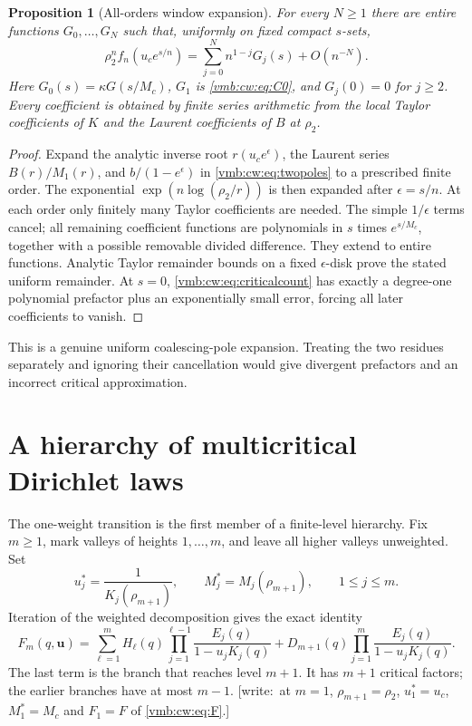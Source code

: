 \documentclass[11pt,a4paper]{article}
\numberwithin{equation}{section}
\newtheorem{proposition}[theorem]{Proposition}
\theoremstyle{definition}\newtheorem{definition}[theorem]{Definition}
\theoremstyle{remark}\newtheorem{remark}[theorem]{Remark}
\newcommand{\wrt}[1]{\textup{[}\textsf{write:}~#1\textup{]}}
\begin{document}
\begin{proposition}[All-orders window expansion]\label{vmb:cw:prop:windowall}
For every $N\ge1$ there are entire functions $G_0,\ldots,G_N$ such that,
uniformly on fixed compact $s$-sets,
\begin{equation}\label{vmb:cw:eq:allwindow}
 \rho_2^nf_n(u_c e^{s/n})
 =\sum_{j=0}^{N}n^{1-j}G_j(s)+O(n^{-N}).
\end{equation}
Here $G_0(s)=\kappa G(s/M_c)$, $G_1$ is \eqref{vmb:cw:eq:C0}, and $G_j(0)=0$ for $j\ge2$.
Every coefficient is obtained by finite series arithmetic from the local
Taylor coefficients of $K$ and the Laurent coefficients of $B$ at $\rho_2$.
\end{proposition}
\begin{proof}
Expand the analytic inverse root $r(u_c e^\epsilon)$, the Laurent series
$B(r)/M_1(r)$, and $b/(1-e^\epsilon)$ in \eqref{vmb:cw:eq:twopoles} to a prescribed
finite order. The exponential $\exp(n\log(\rho_2/r))$ is then expanded after
$\epsilon=s/n$. At each order only finitely many Taylor coefficients are
needed. The simple $1/\epsilon$ terms cancel; all remaining coefficient
functions are polynomials in $s$ times $e^{s/M_c}$, together with a possible
removable divided difference. They extend to entire functions. Analytic
Taylor remainder bounds on a fixed $\epsilon$-disk prove the stated uniform
remainder. At $s=0$, \eqref{vmb:cw:eq:criticalcount} has exactly a degree-one
polynomial prefactor plus an exponentially small error, forcing all later
coefficients to vanish.
\end{proof}

This is a genuine uniform coalescing-pole expansion. Treating the two
residues separately and ignoring their cancellation would give divergent
prefactors and an incorrect critical approximation.

\section{A hierarchy of multicritical Dirichlet laws}
\label{vmb:cw:sec:multi}
The one-weight transition is the first member of a finite-level hierarchy.
Fix $m\ge1$, mark valleys of heights $1,\ldots,m$, and leave all higher
valleys unweighted. Set
\begin{equation}\label{vmb:cw:eq:multiweights}
 u_j^*=\frac1{K_j(\rho_{m+1})},\qquad
 M_j^*=M_j(\rho_{m+1}),\qquad 1\le j\le m.
\end{equation}
Iteration of the weighted decomposition gives the exact identity
\begin{equation}\label{vmb:cw:eq:multidecomp}
 F_m(q,\bm u)=
 \sum_{\ell=1}^{m}H_\ell(q)
   \prod_{j=1}^{\ell-1}\frac{E_j(q)}{1-u_jK_j(q)}
 +D_{m+1}(q)\prod_{j=1}^{m}\frac{E_j(q)}{1-u_jK_j(q)}.
\end{equation}
The last term is the branch that reaches level $m+1$. It has $m+1$ critical
factors; the earlier branches have at most $m-1$.
\wrt{at $m=1$, $\rho_{m+1}=\rho_2$, $u_1^*=u_c$, $M_1^*=M_c$ and $F_1=F$ of
\eqref{vmb:cw:eq:F}.}
\end{document}
